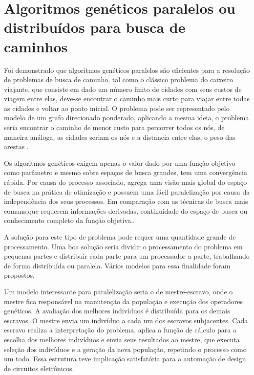 \section{Algoritmos genéticos paralelos ou distribuídos para busca de caminhos}

Foi demonstrado que algoritmos genéticos paralelos são eficientes para a resolução de problemas de busca de caminho, tal como o clássico problema do caixeiro viajante, que consiste em dado um número finito de cidades com seus custos de viagem entre elas, deve-se encontrar o caminho mais curto para viajar entre todas as cidades e voltar ao ponto inicial. O problema pode ser representado pelo modelo de um grafo direcionado ponderado, aplicando a mesma ideia, o problema seria encontrar o caminho de menor custo para percorrer todos os nós, de maneira análoga, as cidades seriam os nós e a distancia entre elas, o peso das arestas \cite{Jason}\cite{Alaoui}\cite{Heinz}.

Os algoritmos genéticos exigem apenas o valor dado por uma função objetivo como parâmetro e mesmo sobre espaços de busca grandes, tem uma convergência rápida. Por causa do processo associado, agrega uma visão mais global do espaço de busca na prática de otimização e possuem uma fácil paralelização por causa da independência dos seus processos. Em comparação com as técnicas de busca mais comuns,que requerem informações derivadas, continuidade do espaço de busca ou conhecimento completo da função objetiva.\cite{Vilson}.

A solução para este tipo de problema pode requer uma quantidade grande de processamento. Uma boa solução seria dividir o processamento do problema em pequenas partes e distribuir cada parte para um processador a parte, trabalhando de forma distribuída ou paralela. Vários modelos para essa finalidade foram propostos.

Um modelo interessante para paralelização seria o de mestre-escravo, onde o mestre fica responsável na manutenção da população e execução dos operadores genéticos. A avaliação dos melhores indivíduos é distribuída para os demais escravos. O mestre envia um indivíduo a cada um dos escravos subjacentes. Cada escravo realiza a interpretação do problema, aplica a função de cálculo para a escolha dos melhores indivíduos e envia seus resultados ao mestre, que executa seleção dos indivíduos e a geração da nova população, repetindo o processo como um todo. Essa estrutura teve implicação satisfatória para a automação de design de circuitos eletrônicos. \cite{Jason}

